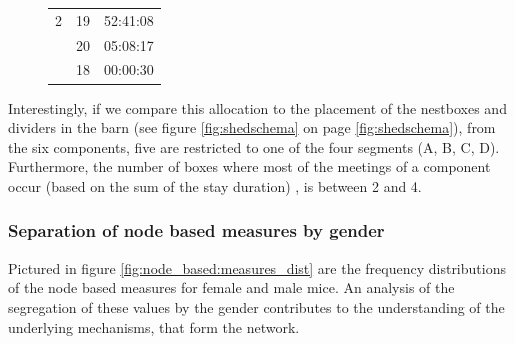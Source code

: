 \begin{figure}[p]
\begin{center}
\begin{tabular}{lll}
2	& 19	& 52:41:08 \\
	& 20	& 05:08:17 \\
	& 18	& 00:00:30 \\\bottomrule

\end{tabular}
\label{tab:comp_box_meet_dist}
\end{center}
\end{figure} 

Interestingly, if we compare this allocation to the placement of the nestboxes and dividers in the barn (see figure \ref{fig:shedschema} on page \ref{fig:shedschema}), from the six components, five are restricted to one of the four segments (A, B, C, D). Furthermore, the number of boxes where most of the meetings of a component occur (based on the sum of the stay duration) , is between 2 and 4. 
 
\subsubsection{Separation of node based measures by gender}
\label{subsubsec:nbm_dist}

Pictured in figure \ref{fig:node_based:measures_dist} are the frequency distributions of the node based measures for female and male mice. An analysis of the segregation of these values by the gender contributes to the understanding of the underlying mechanisms, that form the network.

